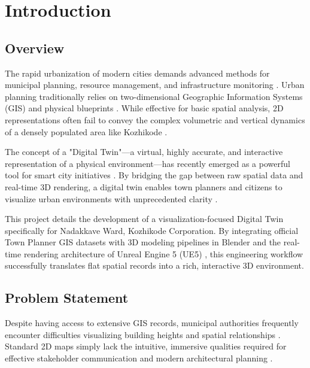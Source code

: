 
\chapter{Introduction}
\label{ch:introduction}

\section{Overview}
The rapid urbanization of modern cities demands advanced methods for municipal planning, resource management, and infrastructure monitoring \cite{ref_urbanization}. Urban planning traditionally relies on two-dimensional Geographic Information Systems (GIS) and physical blueprints \cite{ref_traditional_gis}. While effective for basic spatial analysis, 2D representations often fail to convey the complex volumetric and vertical dynamics of a densely populated area like Kozhikode \cite{ref_hci_cognitive_load}. 

The concept of a "Digital Twin"—a virtual, highly accurate, and interactive representation of a physical environment—has recently emerged as a powerful tool for smart city initiatives \cite{ref_digital_twin_smart_cities}. By bridging the gap between raw spatial data and real-time 3D rendering, a digital twin enables town planners and citizens to visualize urban environments with unprecedented clarity \cite{ref_3d_visualization}. 

This project details the development of a visualization-focused Digital Twin specifically for Nadakkave Ward, Kozhikode Corporation. By integrating official Town Planner GIS datasets with 3D modeling pipelines in Blender \cite{ref_blender_software} and the real-time rendering architecture of Unreal Engine 5 (UE5) \cite{ref_unreal_engine}, this engineering workflow successfully translates flat spatial records into a rich, interactive 3D environment.

\section{Problem Statement}
Despite having access to extensive GIS records, municipal authorities frequently encounter difficulties visualizing building heights and spatial relationships \cite{ref_urban_density}. Standard 2D maps simply lack the intuitive, immersive qualities required for effective stakeholder communication and modern architectural planning \cite{ref_hci_cognitive_load}. 

